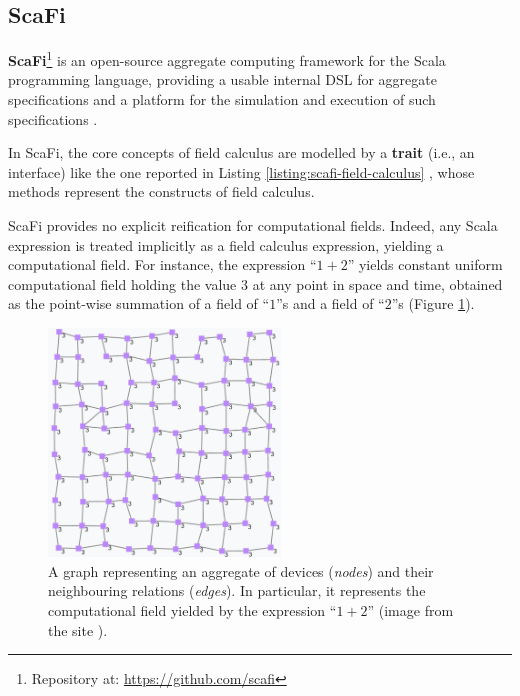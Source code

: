 
\subsection{ScaFi}
\label{section:background:technologies:scafi}

\textbf{\ac{ScaFi}}\footnote{Repository at: \url{https://github.com/scafi}} is an
open-source aggregate computing framework for the Scala programming language,
providing a usable internal \ac{DSL} for aggregate specifications and a
platform for the simulation and execution of such specifications
\cite{ScaFi-Documentation}.

In \ac{ScaFi}, the core concepts of field calculus are modelled by a
\textbf{trait} (i.e., an interface) like the one reported in Listing
\ref{listing:scafi-field-calculus} \cite{FieldCalculus-AggregateComputing},
whose methods represent the constructs of field calculus.



\ac{ScaFi} provides no explicit reification for computational fields. Indeed,
any Scala expression is treated implicitly as a field calculus expression,
yielding a computational field. For instance, the expression \enquote{$1+2$}
yields constant uniform computational field holding the value $3$ at any point
in space and time, obtained as the point-wise summation of a field of
\enquote{$1$}s and a field of \enquote{$2$}s (Figure
\ref{figure:constant-uniform-field}).

\begin{figure}[h]
  \centering
  \includegraphics[width=0.55\textwidth]{resources/figures/constant-uniform-field.png}
  \caption{
    A graph representing an aggregate of devices (\textit{nodes}) and their
    neighbouring relations (\textit{edges}). In particular, it represents the
    computational field yielded by the expression \enquote{$1+2$}
    (image from the site \cite{ScaFi-Documentation}).
  }
  \label{figure:constant-uniform-field}
\end{figure}

